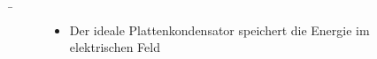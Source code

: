 \begin{frame}
	\b{
\begin{figure}[H]
\centering
\begin{minipage}[t]{0.49\textwidth}
    \centering
	\hspace*{-1cm}
    

    \begin{itemize}
		\vspace{0.22cm}
        \item Der ideale Plattenkondensator speichert die Energie im elektrischen Feld
    \end{itemize}
\end{minipage}\hfill
\begin{minipage}[t]{0.49\textwidth}
    \centering
	\hspace*{-1cm}
\end{minipage}
\end{figure}}



\end{frame}
